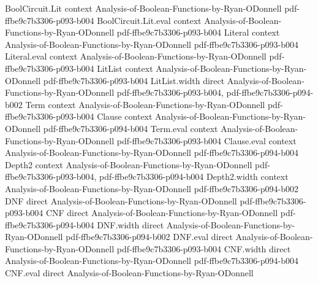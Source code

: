 \begin{theorem}
\label{DecisionTree.spectral_one_norm_le}
\leanok
{}
\proofstep
  {BoolCircuit.Lit}
  {context}
  {Analysis-of-Boolean-Functions-by-Ryan-ODonnell}
  {pdf-ffbe9c7b3306-p093-b004}
\proofstep
  {BoolCircuit.Lit.eval}
  {context}
  {Analysis-of-Boolean-Functions-by-Ryan-ODonnell}
  {pdf-ffbe9c7b3306-p093-b004}
\proofstep
  {Literal}
  {context}
  {Analysis-of-Boolean-Functions-by-Ryan-ODonnell}
  {pdf-ffbe9c7b3306-p093-b004}
\proofstep
  {Literal.eval}
  {context}
  {Analysis-of-Boolean-Functions-by-Ryan-ODonnell}
  {pdf-ffbe9c7b3306-p093-b004}
\proofstep
  {LitList}
  {context}
  {Analysis-of-Boolean-Functions-by-Ryan-ODonnell}
  {pdf-ffbe9c7b3306-p093-b004}
\proofstep
  {LitList.width}
  {direct}
  {Analysis-of-Boolean-Functions-by-Ryan-ODonnell}
  {pdf-ffbe9c7b3306-p093-b004,
    pdf-ffbe9c7b3306-p094-b002}
\proofstep
  {Term}
  {context}
  {Analysis-of-Boolean-Functions-by-Ryan-ODonnell}
  {pdf-ffbe9c7b3306-p093-b004}
\proofstep
  {Clause}
  {context}
  {Analysis-of-Boolean-Functions-by-Ryan-ODonnell}
  {pdf-ffbe9c7b3306-p094-b004}
\proofstep
  {Term.eval}
  {context}
  {Analysis-of-Boolean-Functions-by-Ryan-ODonnell}
  {pdf-ffbe9c7b3306-p093-b004}
\proofstep
  {Clause.eval}
  {context}
  {Analysis-of-Boolean-Functions-by-Ryan-ODonnell}
  {pdf-ffbe9c7b3306-p094-b004}
\proofstep
  {Depth2}
  {context}
  {Analysis-of-Boolean-Functions-by-Ryan-ODonnell}
  {pdf-ffbe9c7b3306-p093-b004,
    pdf-ffbe9c7b3306-p094-b004}
\proofstep
  {Depth2.width}
  {context}
  {Analysis-of-Boolean-Functions-by-Ryan-ODonnell}
  {pdf-ffbe9c7b3306-p094-b002}
\proofstep
  {DNF}
  {direct}
  {Analysis-of-Boolean-Functions-by-Ryan-ODonnell}
  {pdf-ffbe9c7b3306-p093-b004}
\proofstep
  {CNF}
  {direct}
  {Analysis-of-Boolean-Functions-by-Ryan-ODonnell}
  {pdf-ffbe9c7b3306-p094-b004}
\proofstep
  {DNF.width}
  {direct}
  {Analysis-of-Boolean-Functions-by-Ryan-ODonnell}
  {pdf-ffbe9c7b3306-p094-b002}
\proofstep
  {DNF.eval}
  {direct}
  {Analysis-of-Boolean-Functions-by-Ryan-ODonnell}
  {pdf-ffbe9c7b3306-p093-b004}
\proofstep
  {CNF.width}
  {direct}
  {Analysis-of-Boolean-Functions-by-Ryan-ODonnell}
  {pdf-ffbe9c7b3306-p094-b004}
\proofstep
  {CNF.eval}
  {direct}
  {Analysis-of-Boolean-Functions-by-Ryan-ODonnell}

\end{theorem}
